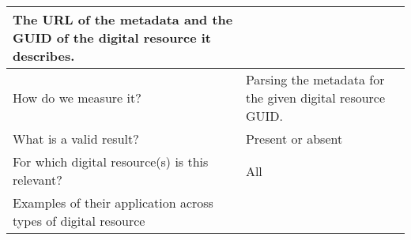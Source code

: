 \documentclass[english]{article}
\begin{document}
\begin{longtable}{|p{5cm}|p{9cm}|}
The URL of the metadata and the GUID of the digital resource it describes.


 \\



\hline
How do we measure it? &  

Parsing the metadata for the given digital resource GUID.

\\



\hline
What is a valid result? &  


Present or absent


\\



\hline
For which digital resource(s) is this relevant? &  All\\



\hline
Examples of their application across types of digital resource &  


\end{longtable}
\end{document}
